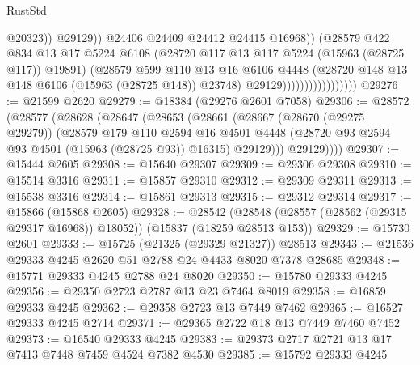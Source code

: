 \begin{lexlean}{RustStd}
\begin{coremodule}
{\begin{coremodule}
{{{{{{{{{{{{{{{{{{{{{{{{{{{{{{{{{{{{{{{{{{{{{{{{{{{{{{{{{{{{                                              @20323))
                                          @29129))
                                      @24406
                                      @24409
                                      @24412
                                      @24415
                                      @16968))
                                  (@28579
                                    @422
                                    @834
                                    @13
                                    @17
                                    @5224
                                    @6108
                                    (@28720 @117 @13 @117 @5224 (@15963 (@28725 @117)) @19891)
                                    (@28579
                                      @599
                                      @110
                                      @13
                                      @16
                                      @6106
                                      @4448
                                      (@28720 @148 @13 @148 @6106 (@15963 (@28725 @148)) @23748)
                                      @29129)))))))))))))))))
@29276 := @21599 @2620
@29279 := @18384 (@29276 @2601 @7058)
@29306 := @28572
    (@28577
      (@28628
        (@28647
          (@28653
            (@28661
              (@28667
                (@28670 (@29275 @29279))
                (@28579
                  @179
                  @110
                  @2594
                  @16
                  @4501
                  @4448
                  (@28720 @93 @2594 @93 @4501 (@15963 (@28725 @93)) @16315)
                  @29129)))
            @29129))))
@29307 := @15444 @2605
@29308 := @15640 @29307
@29309 := @29306 @29308
@29310 := @15514 @3316
@29311 := @15857 @29310
@29312 := @29309 @29311
@29313 := @15538 @3316
@29314 := @15861 @29313
@29315 := @29312 @29314
@29317 := @15866 (@15868 @2605)
@29328 := @28542
    (@28548 (@28557 (@28562 (@29315 @29317 @16968)) @18052))
    (@15837 (@18259 @28513 @153))
@29329 := @15730 @2601
@29333 := @15725 (@21325 (@29329 @21327)) @28513
@29343 := @21536 @29333 @4245 @2620 @51 @2788 @24 @4433 @8020 @7378 @28685
@29348 := @15771 @29333 @4245 @2788 @24 @8020
@29350 := @15780 @29333 @4245
@29356 := @29350 @2723 @2787 @13 @23 @7464 @8019
@29358 := @16859 @29333 @4245
@29362 := @29358 @2723 @13 @7449 @7462
@29365 := @16527 @29333 @4245 @2714
@29371 := @29365 @2722 @18 @13 @7449 @7460 @7452
@29373 := @16540 @29333 @4245
@29383 := @29373 @2717 @2721 @13 @17 @7413 @7448 @7459 @4524 @7382 @4530
@29385 := @15792 @29333 @4245
}}}}}}}}}}}}}}}}}}}}}}}}}}}}}}}}}}}}}}}}}}}}}}}}}}}}}}}}}}}}
\end{coremodule}}
\end{coremodule}
\end{lexlean}
